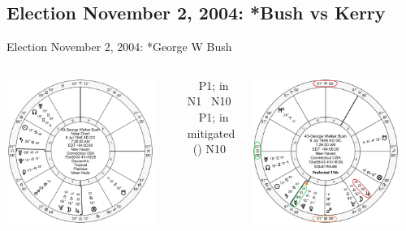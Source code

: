 \subsection{Election November 2, 2004: *Bush vs Kerry}
\begin{frame}[t]{Election November 2, 2004: *George W Bush}
\small

\begin{columns}[T, onlytextwidth]
\vspace{-1em}
{\includegraphics[width=0.9\textwidth]{charts/GW-Bush.png}}
\fontsize{7pt}{8pt}\selectfont

\Mercury\, \Sextile\, P1; in N1 \Square\, N10 \\
\Jupiter\, \Trine\, P1; in mitigated \Quincunx\, (\Opposition) N10

\vspace{-1em}
{\includegraphics[width=0.9\textwidth]{charts/GW-Bush-Prof-11th.png}}
\fontsize{8pt}{9pt}\selectfont


\end{columns}
\end{frame}
